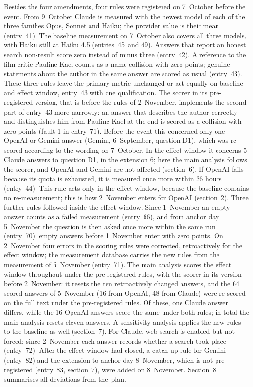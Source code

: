 \documentclass[11pt]{article}
\begin{document}
Besides the four amendments, four rules were registered on 7~October before the event. From 9~October Claude is measured with the newest model of each of the three families Opus, Sonnet and Haiku; the provider value is their mean (entry~41). The baseline measurement on 7~October also covers all three models, with Haiku still at Haiku 4.5 (entries~45~and 49). Answers that report an honest search non-result score zero instead of minus three (entry~42). A reference to the film critic Pauline Kael counts as a name collision with zero points; genuine statements about the author in the same answer are scored as usual (entry~43). These three rules leave the primary metric unchanged or act equally on baseline and effect window, entry~43 with one qualification. The scorer in its pre-registered version, that is before the rules of 2~November, implements the second part of entry~43 more narrowly: an answer that describes the author correctly and distinguishes him from Pauline Kael at the end is scored as a collision with zero points (fault 1 in entry~71). Before the event this concerned only one OpenAI or Gemini answer (Gemini, 6~September, question D1), which was re-scored according to the wording on 7~October. In the effect window it concerns 5 Claude answers to question D1, in the extension 6; here the main analysis follows the scorer, and OpenAI and Gemini are not affected (section~6). If OpenAI fails because its quota is exhausted, it is measured once more within 36 hours (entry~44). This rule acts only in the effect window, because the baseline contains no re-measurement; this is how 2~November enters for OpenAI (section~2). Three further rules followed inside the effect window. Since 1~November an empty answer counts as a failed measurement (entry~66), and from anchor day 5~November the question is then asked once more within the same run (entry~70); empty answers before 1~November enter with zero points. On 2~November four errors in the scoring rules were corrected, retroactively for the effect window; the measurement database carries the new rules from the measurement of 5~November (entry~71). The main analysis scores the effect window throughout under the pre-registered rules, with the scorer in its version before 2~November: it resets the ten retroactively changed answers, and the 64 scored answers of 5~November (16 from OpenAI, 48 from Claude) were re-scored on the full text under the pre-registered rules. Of these, one Claude answer differs, while the 16 OpenAI answers score the same under both rules; in total the main analysis resets eleven answers. A sensitivity analysis applies the new rules to the baseline as well (section~7). For Claude, web search is enabled but not forced; since 2~November each answer records whether a search took place (entry~72). After the effect window had closed, a catch-up rule for Gemini (entry~82) and the extension to anchor day 8~November, which is not pre-registered (entry~83, section~7), were added on 8~November. Section~8 summarises all deviations from the~\mbox{plan.}
\end{document}
